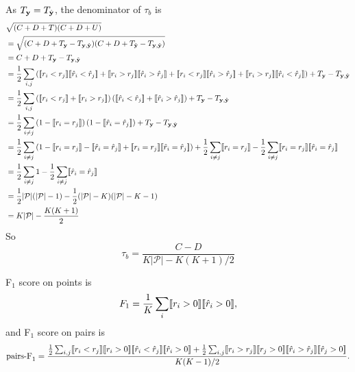 As $T_{\mathbf{y}} = T_{\hat{\mathbf{y}}}$, the denominator of $\tau_b$ is 
\begin{align*}
&\sqrt{(C + D + T)(C + D + U)} \\
&= \sqrt{(C + D + T_{\mathbf{y}} - T_{\mathbf{y},\hat{\mathbf{y}}})(C + D + T_{\hat{\mathbf{y}}} - T_{\mathbf{y},\hat{\mathbf{y}}})} \\
&= C + D + T_{\mathbf{y}} - T_{\mathbf{y},\hat{\mathbf{y}}} \\
&= \frac{1}{2} \sum_{i,j} \left( \llbracket r_i < r_j \rrbracket \llbracket \hat{r}_i < \hat{r}_j \rrbracket + \llbracket r_i > r_j \rrbracket \llbracket \hat{r}_i > \hat{r}_j \rrbracket +
                                 \llbracket r_i < r_j \rrbracket \llbracket \hat{r}_i > \hat{r}_j \rrbracket + \llbracket r_i > r_j \rrbracket \llbracket \hat{r}_i < \hat{r}_j \rrbracket \right) +
   T_{\mathbf{y}} - T_{\mathbf{y},\hat{\mathbf{y}}} \\
&= \frac{1}{2} \sum_{i,j} \left( \llbracket r_i < r_j \rrbracket + \llbracket r_i > r_j \rrbracket \right) 
                          \left( \llbracket \hat{r}_i < \hat{r}_j \rrbracket + \llbracket \hat{r}_i > \hat{r}_j \rrbracket \right) + T_{\mathbf{y}} - T_{\mathbf{y},\hat{\mathbf{y}}} \\
&= \frac{1}{2} \sum_{i \ne j} \left( 1 - \llbracket r_i = r_j \rrbracket \right) \left( 1 - \llbracket \hat{r}_i = \hat{r}_j \rrbracket \right) + T_{\mathbf{y}} - T_{\mathbf{y},\hat{\mathbf{y}}} \\
&= \frac{1}{2} \sum_{i \ne j} \left( 1 - \llbracket r_i = r_j \rrbracket - \llbracket \hat{r}_i = \hat{r}_j \rrbracket + 
                                         \llbracket r_i = r_j \rrbracket \llbracket \hat{r}_i = \hat{r}_j \rrbracket \right) + 
   \frac{1}{2} \sum_{i \ne j} \llbracket r_i = r_j \rrbracket - \frac{1}{2} \sum_{i \ne j} \llbracket r_i = r_j \rrbracket \llbracket \hat{r}_i = \hat{r}_j \rrbracket \\
&= \frac{1}{2} \sum_{i \ne j} 1 - \frac{1}{2} \sum_{i \ne j} \llbracket \hat{r}_i = \hat{r}_j \rrbracket \\
&= \frac{1}{2} |\mathcal{P}|(|\mathcal{P}| - 1) - \frac{1}{2} (|\mathcal{P}| - K) (|\mathcal{P}| - K - 1) \\
&= K|\mathcal{P}| - \frac{K(K + 1)}{2}
\end{align*}
So
\begin{equation*}
\tau_b = \frac{C - D}{K|\mathcal{P}| - K(K + 1)/2}
\end{equation*}

F$_1$ score on points is
\begin{equation*}
F_1 = \frac{1}{K} \sum_i \llbracket r_i > 0 \rrbracket  \llbracket \hat{r}_i > 0 \rrbracket,
\end{equation*}
and F$_1$ score on pairs is
\begin{equation*}
\text{pairs-F}_1 = \frac{\frac{1}{2} \sum_{i,j} 
                   \llbracket r_i < r_j \rrbracket  \llbracket r_i > 0 \rrbracket 
                   \llbracket \hat{r}_i < \hat{r}_j \rrbracket  \llbracket \hat{r}_i > 0 \rrbracket +
                   \frac{1}{2} \sum_{i,j} 
                   \llbracket r_i > r_j \rrbracket  \llbracket r_j > 0 \rrbracket 
                   \llbracket \hat{r}_i > \hat{r}_j \rrbracket  \llbracket \hat{r}_j > 0 \rrbracket}{K(K-1)/2}.
\end{equation*}

